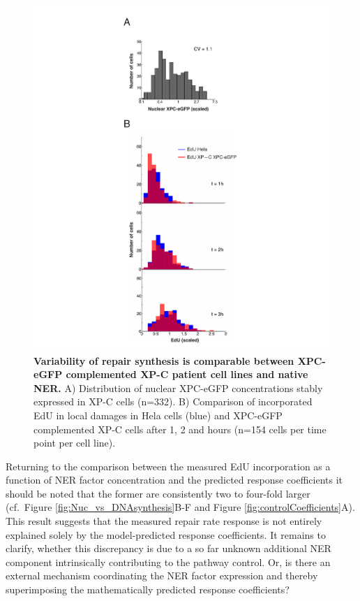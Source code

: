\begin{figure}[htbp]
	\begin{center}
		\includegraphics[width=1\textwidth]{Abbildungen/figure3_4.pdf}
		\caption{\textbf{Variability of repair synthesis is comparable between XPC-eGFP complemented XP-C patient cell lines and native NER.} A) Distribution of nuclear XPC-eGFP concentrations stably expressed in XP-C cells (n=332). B) Comparison of incorporated EdU in local damages in Hela cells (blue) and XPC-eGFP complemented XP-C cells after 1, 2 and hours (n=154 cells per time point per cell line). }
		\label{fig:consistVariability}
	\end{center}
\end{figure}



Returning to the comparison between the measured EdU incorporation as a function of NER factor concentration and the predicted response coefficients it should be noted that the  former are consistently two to four-fold larger (cf.\ Figure \ref{fig:Nuc_vs_DNAsynthesis}B-F and Figure \ref{fig:controlCoefficients}A). This result suggests that the measured repair rate response is not entirely explained solely by the model-predicted response coefficients. It remains to clarify, whether this discrepancy is due to a so far unknown additional NER component intrinsically contributing to the pathway control. Or, is there an external mechanism coordinating the NER factor expression and thereby superimposing the mathematically predicted response coefficients?

